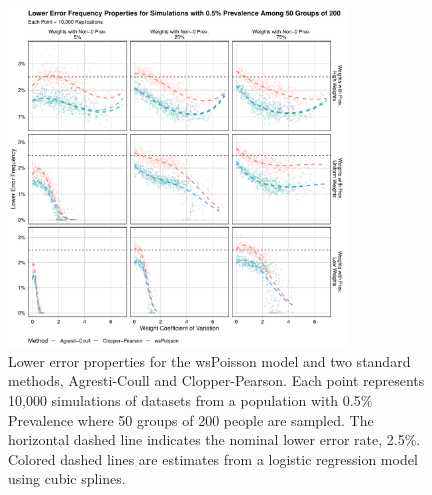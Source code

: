 \documentclass[AMA,STIX1COL]{WileyNJD-v2}
\begin{document}
\begin{figure}
\centering
\includegraphics[width=0.8\textwidth]{figures/perfect_lower_error_frequency_50_groups_0_005_prev.pdf}
\caption{Lower error properties for the wsPoisson model and two standard methods, Agresti-Coull and Clopper-Pearson.
Each point represents 10,000 simulations of datasets from a population with 0.5\% Prevalence where 50 groups of 200 people are sampled.
The horizontal dashed line indicates the nominal lower error rate, 2.5\%.
Colored dashed lines are estimates from a logistic regression model using cubic splines.}
\label{fig:perfect_lower_error_frequency_50_groups_0_005_prev}
\end{figure}
\end{document}
